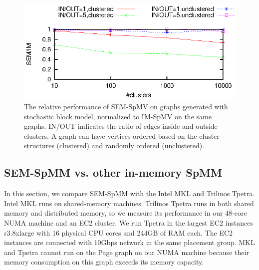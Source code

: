 \begin{figure}
	\begin{center}
		\footnotesize
		\includegraphics[scale=1]{SpMM_figs/spmm-sbm.eps}
		\caption{The relative performance of SEM-SpMV on graphs generated with
			stochastic block model, normalized to IM-SpMV on the same graphs.
			IN/OUT indicates the ratio of edges inside and outside clusters.
			A graph can have vertices ordered based on the cluster structures
		(clustered) and randomly ordered (unclustered).}
		\label{perf:spmm_sbm}
	\end{center}
\end{figure}

\subsection{SEM-SpMM vs. other in-memory SpMM}
In this section, we compare SEM-SpMM with the Intel MKL and Trilinos Tpetra.
Intel MKL runs on shared-memory machines. Trilinos Tpetra runs in
both shared memory and distributed memory, so we measure its performance in
our 48-core NUMA machine and an EC2 cluster. We run Tpetra in the largest
EC2 instances r3.8xlarge with 16 physical CPU cores and 244GB of RAM each.
The EC2 instances are connected with 10Gbps network in the same placement
group. MKL and Tpetra cannot run on the Page graph on our NUMA machine because
their memory consumption on this graph exceeds its memory capacity.

